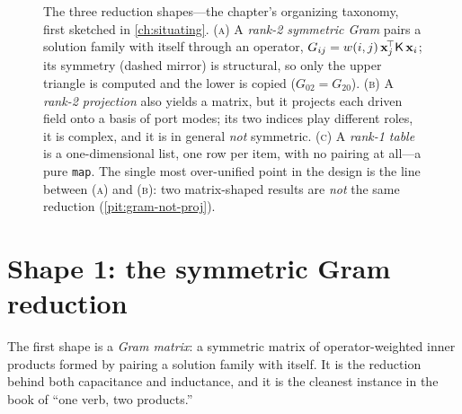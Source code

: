 \begin{figure}[p]
\caption[The three reduction shapes]{The three reduction shapes---the chapter's
organizing taxonomy, first sketched in \cref{ch:situating}. \textsc{(a)} A
\emph{rank-2 symmetric Gram} pairs a solution family with itself through an
operator, $G_{ij}=w(i,j)\,\mathbf{x}_j^{\!\top}\mathsf{K}\,\mathbf{x}_i$; its symmetry (dashed
mirror) is structural, so only the upper triangle is computed and the lower is
copied ($G_{02}=G_{20}$). \textsc{(b)} A \emph{rank-2 projection} also yields a
matrix, but it projects each driven field onto a basis of port modes; its two
indices play different roles, it is complex, and it is in general \emph{not}
symmetric. \textsc{(c)} A \emph{rank-1 table} is a one-dimensional list, one row
per item, with no pairing at all---a pure \texttt{map}. The single most
over-unified point in the design is the line between \textsc{(a)} and
\textsc{(b)}: two matrix-shaped results are \emph{not} the same reduction
(\cref{pit:gram-not-proj}).}
\label{fig:red-taxonomy}
\end{figure}

\section{Shape 1: the symmetric Gram reduction}
\label{sec:gram}

The first shape is a \emph{Gram matrix}: a symmetric matrix of operator-weighted
inner products formed by pairing a solution family with itself. It is the
reduction behind both capacitance and inductance, and it is the cleanest
instance in the book of ``one verb, two products.''

